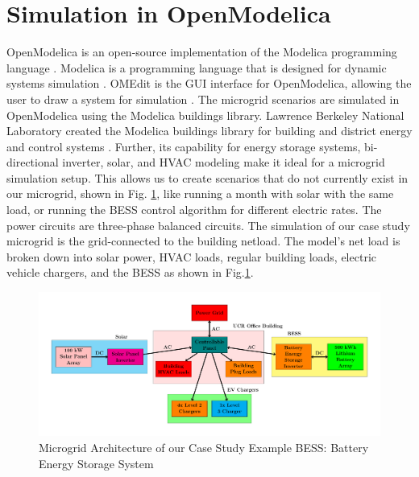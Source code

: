 \documentclass[conference]{IEEEtran}
\begin{document}
\section{Simulation in OpenModelica}
    	OpenModelica is an open-source implementation of the Modelica programming language \cite{OpenModelica}. Modelica is a programming language that is designed for dynamic systems simulation \cite{ModelicaLanguage}. OMEdit is the GUI interface for OpenModelica, allowing the user to draw a system for simulation \cite{OMEdit}. The microgrid scenarios are simulated in OpenModelica using the Modelica buildings library.  Lawrence Berkeley National Laboratory created the Modelica buildings library for building and district energy and control systems \cite{ModelicaBuildingsLibrary}. Further, its capability for energy storage systems, bi-directional inverter, solar, and HVAC modeling make it ideal for a microgrid simulation setup. This allows us to create scenarios that do not currently exist in our microgrid, shown in Fig. \ref{fig:powersystemsetupfull}, like running a month with solar with the same load, or running the BESS control algorithm for different electric rates.  The power circuits are three-phase balanced circuits. The simulation of our case study microgrid is the grid-connected to the building netload. The model's net load is broken down into solar power, HVAC loads, regular building loads, electric vehicle chargers, and the BESS as shown in Fig.\ref{fig:powersystemsetupfull}.
	\begin{figure}
		\centering
		\includegraphics[width=0.7\linewidth]{Fig/power_system_setup_modelica_large}
		\caption{\footnotesize Microgrid Architecture of our Case Study Example BESS: Battery Energy Storage System}
		\label{fig:powersystemsetupfull}
	\end{figure}
\end{document}
